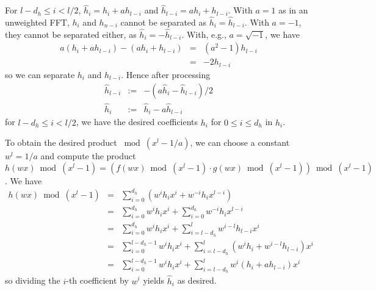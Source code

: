 \documentclass{article}
\begin{document}
For $l-d_h \leq i < l/2$, $\hat{h}_i = h_i + ah_{l-i}$ and 
$\hat{h}_{l-i} = ah_i + h_{l-i}$. With $a=1$ as in an unweighted FFT,
$h_i$ and $h_{n-i}$ cannot be separated as $\hat{h}_i = \hat{h}_{l-i}$. 
With $a=-1$, they cannot be separated either, as 
$\hat{h}_i = - \hat{h}_{l-i}$. 
With, e.g., $a=\sqrt{-1}$, we have
\begin{eqnarray*}
a (h_i + ah_{l-i}) - (ah_i + h_{l-i}) & = & (a^2-1) h_{l-i} \\
 & = & -2 h_{l-i}
\end{eqnarray*}
so we can separate $h_i$ and $h_{l-i}$. Hence after processing
\begin{eqnarray*}
\hat{h}_{l-i} & := & -(a \hat{h}_i - \hat{h}_{l-i})/2 \\
\hat{h}_i & := & \hat{h}_i - a\hat{h}_{l-i}
\end{eqnarray*}
for $l-d_h \leq i < l/2$, we have the desired coefficients $h_i$ for 
$0 \leq i \leq d_h$ in $\hat{h}_i$.





To obtain the desired product $\bmod{(x^l-1/a)}$, we can choose a  
constant $w^l=1/a$ and compute the product
$h(wx) \bmod{(x^l-1)} = 
(f(wx) \bmod{(x^l-1)} \cdot g(wx) \bmod{(x^l-1)}) \bmod {(x^l-1)}$. We have
\begin{eqnarray*}
 h(wx) \bmod{(x^l-1)} & = & \sum_{i=0}^{d_h} (w^i h_i x^i + w^{-i} h_i x^{l-i}) \\
 & = & \sum_{i=0}^{d_h} w^i h_i x^i + \sum_{i=0}^{d_h} w^{-i} h_i x^{l-i} \\
 & = & \sum_{i=0}^{d_h} w^i h_i x^i + \sum_{i=l-d_h}^l w^{i-l} h_{l-i} x^i \\
 & = & \sum_{i=0}^{l-d_h-1} w^i h_i x^i + \sum_{i=l-d_h}^l (w^i h_i + w^{i-l} h_{l-i}) x^i \\
 & = & \sum_{i=0}^{l-d_h-1} w^i h_i x^i + \sum_{i=l-d_h}^l w^i (h_i + a h_{l-i}) x^i
\end{eqnarray*}
so dividing the $i$-th coefficient by $w^i$ yields $\hat{h}_i$ as desired.
\end{document}
